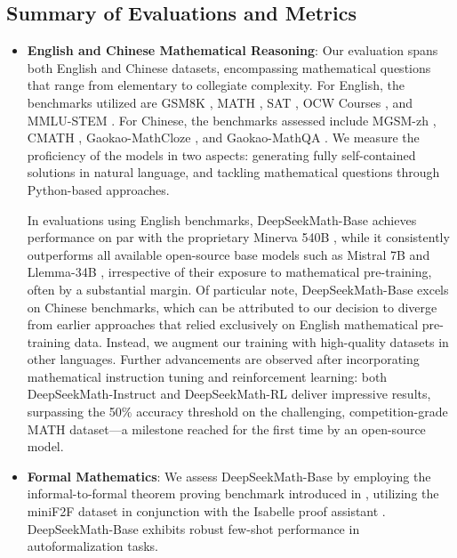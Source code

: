 \subsection{Summary of Evaluations and Metrics}

\begin{itemize}[topsep=0pt]
    \item \textbf{English and Chinese Mathematical Reasoning}: Our evaluation spans both English and Chinese datasets, encompassing mathematical questions that range from elementary to collegiate complexity. For English, the benchmarks utilized are GSM8K \citep{gsm8k}, MATH \citep{MATH}, SAT \citep{llemma}, OCW Courses \citep{minerva}, and MMLU-STEM \citep{mmlu}. For Chinese, the benchmarks assessed include MGSM-zh \citep{mgsm}, CMATH \citep{wei2023cmath}, Gaokao-MathCloze \citep{agieval}, and Gaokao-MathQA \citep{agieval}. We measure the proficiency of the models in two aspects: generating fully self-contained solutions in natural language, and tackling mathematical questions through Python-based approaches.

In evaluations using English benchmarks, DeepSeekMath-Base achieves performance on par with the proprietary Minerva 540B \citep{minerva}, while it consistently outperforms all available open-source base models such as Mistral 7B \citep{mistral} and Llemma-34B \citep{llemma}, irrespective of their exposure to mathematical pre-training, often by a substantial margin. Of particular note, DeepSeekMath-Base excels on Chinese benchmarks, which can be attributed to our decision to diverge from earlier approaches \citep{minerva,llemma} that relied exclusively on English mathematical pre-training data. Instead, we augment our training with high-quality datasets in other languages. Further advancements are observed after incorporating mathematical instruction tuning and reinforcement learning: both DeepSeekMath-Instruct and DeepSeekMath-RL deliver impressive results, surpassing the 50\% accuracy threshold on the challenging, competition-grade MATH dataset—a milestone reached for the first time by an open-source model.

\item \textbf{Formal Mathematics}: We assess DeepSeekMath-Base by employing the informal-to-formal theorem proving benchmark introduced in \citep{dsp_proof}, utilizing the miniF2F dataset \citep{minif2f} in conjunction with the Isabelle proof assistant \citep{isabelle}. DeepSeekMath-Base exhibits robust few-shot performance in autoformalization tasks.


\end{itemize}
